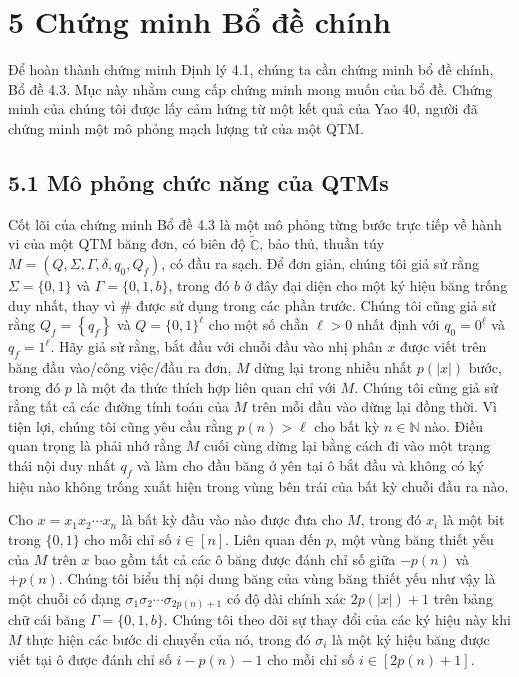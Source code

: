 \documentclass[10pt]{article}
\begin{document}
\section*{5 Chứng minh Bổ đề chính}
Để hoàn thành chứng minh Định lý 4.1, chúng ta cần chứng minh bổ đề chính, Bổ đề 4.3. Mục này nhằm cung cấp chứng minh mong muốn của bổ đề. Chứng minh của chúng tôi được lấy cảm hứng từ một kết quả của Yao 40, người đã chứng minh một mô phỏng mạch lượng tử của một QTM.

\subsection*{5.1 Mô phỏng chức năng của QTMs}
Cốt lõi của chứng minh Bổ đề 4.3 là một mô phỏng từng bước trực tiếp về hành vi của một QTM băng đơn, có biên độ $\tilde{\mathbb{C}}$, bảo thủ, thuần túy $M=\left(Q, \Sigma, \Gamma, \delta, q_{0}, Q_{f}\right)$, có đầu ra sạch. Để đơn giản, chúng tôi giả sử rằng $\Sigma=\{0,1\}$ và $\Gamma=\{0,1, b\}$, trong đó $b$ ở đây đại diện cho một ký hiệu băng trống duy nhất, thay vì $\#$ được sử dụng trong các phần trước. Chúng tôi cũng giả sử rằng $Q_{f}=\left\{q_{f}\right\}$ và $Q=\{0,1\}^{\ell}$ cho một số chẵn $\ell>0$ nhất định với $q_{0}=0^{\ell}$ và $q_{f}=1^{\ell}$. Hãy giả sử rằng, bắt đầu với chuỗi đầu vào nhị phân $x$ được viết trên băng đầu vào/công việc/đầu ra đơn, $M$ dừng lại trong nhiều nhất $p(|x|)$ bước, trong đó $p$ là một đa thức thích hợp liên quan chỉ với $M$. Chúng tôi cũng giả sử rằng tất cả các đường tính toán của $M$ trên mỗi đầu vào dừng lại đồng thời. Vì tiện lợi, chúng tôi cũng yêu cầu rằng $p(n)>\ell$ cho bất kỳ $n \in \mathbb{N}$ nào. Điều quan trọng là phải nhớ rằng $M$ cuối cùng dừng lại bằng cách đi vào một trạng thái nội duy nhất $q_{f}$ và làm cho đầu băng ở yên tại ô bắt đầu và không có ký hiệu nào không trống xuất hiện trong vùng bên trái của bất kỳ chuỗi đầu ra nào.

Cho $x=x_{1} x_{2} \cdots x_{n}$ là bất kỳ đầu vào nào được đưa cho $M$, trong đó $x_{i}$ là một bit trong $\{0,1\}$ cho mỗi chỉ số $i \in[n]$. Liên quan đến $p$, một vùng băng thiết yếu của $M$ trên $x$ bao gồm tất cả các ô băng được đánh chỉ số giữa $-p(n)$ và $+p(n)$. Chúng tôi biểu thị nội dung băng của vùng băng thiết yếu như vậy là một chuỗi có dạng $\sigma_{1} \sigma_{2} \cdots \sigma_{2 p(n)+1}$ có độ dài chính xác $2 p(|x|)+1$ trên bảng chữ cái băng $\Gamma=\{0,1, b\}$. Chúng tôi theo dõi sự thay đổi của các ký hiệu này khi $M$ thực hiện các bước di chuyển của nó, trong đó $\sigma_{i}$ là một ký hiệu băng được viết tại ô được đánh chỉ số $i-p(n)-1$ cho mỗi chỉ số $i \in[2 p(n)+1]$.
\end{document}
